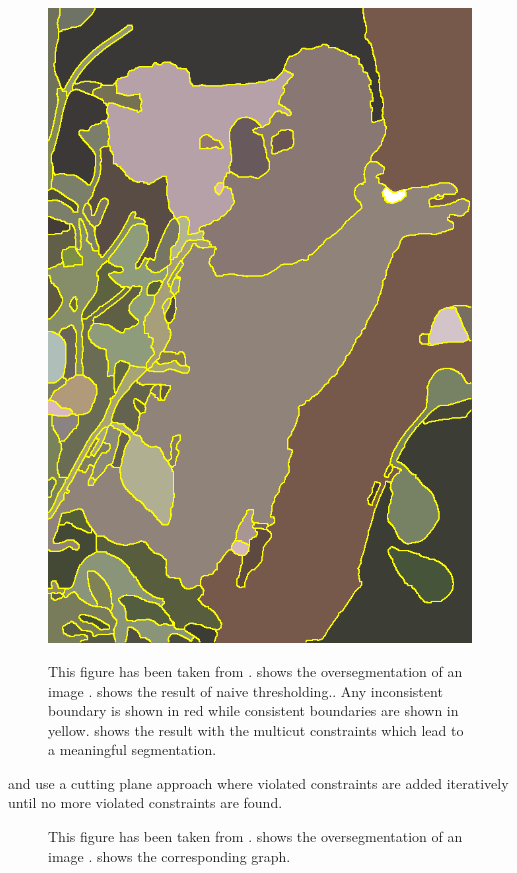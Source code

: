 \begin{figure}
{{        \protect\includegraphics[width=.075\linewidth]{fig/andres/2.png} 
    }%
}%
\caption[Naive thresholding vs. multicuts]{
This figure has been taken from \cite{andres_2011_iccv} .
 shows the oversegmentation of 
an image .
 shows the result of naive thresholding..
Any inconsistent boundary is shown in red while consistent
boundaries are shown in yellow. 
 shows the result with the multicut
constraints which lead to a meaningful segmentation.
} \label{fig:naive_thresholding}
\end{figure}


\citet{andres_2011_iccv} and \citet{kappes_2011_emmcvpr} use a
cutting plane approach where violated constraints are added
iteratively until no more violated constraints are found.


\begin{figure}
\centering
{}
%
\caption[Violated multicut constraints]{
This figure has been taken from \cite{andres_2011_iccv} .
 shows the oversegmentation of 
an image .
 shows the corresponding graph.
} \label{fig:mc_ineq}
\end{figure}

